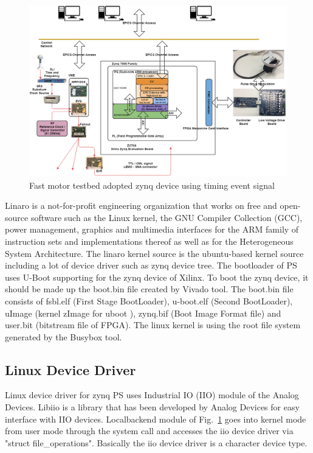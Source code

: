 \documentclass[a4paper,
              ]{jacow}
\begin{document}
\begin{figure}[!tbh]
	\centering
	\includegraphics*[width=\textwidth,height=0.7\textwidth]{WEPGF124f3}
	\caption{Fast motor testbed adopted zynq device using timing event signal}
	\label{stepper}
\end{figure}

Linaro\cite{linaro} is a not-for-profit engineering organization that works on free and open-source software such as the Linux kernel, the GNU Compiler Collection (GCC), power management, graphics and multimedia interfaces for the ARM family of instruction sets and implementations thereof as well as for the Heterogeneous System Architecture.  
The linaro kernel source is the ubuntu-based kernel source including a lot of device driver such as zynq device tree.
The bootloader of PS uses U-Boot\cite{u-boot} supporting for the zynq device of Xilinx. To boot the zynq device, it should be made up the boot.bin file created by Vivado\cite{vivado} tool. The boot.bin\cite{boot-bin} file consists of fsbl.elf (First Stage BootLoader), u-boot.elf (Second BootLoader), uImage (kernel zImage for uboot ), zynq.bif (Boot Image Format file) and user.bit (bitstream file of FPGA). The linux kernel is using the root file system generated by the Busybox\cite{busybox} tool.

\subsection{Linux Device Driver}
Linux device driver for zynq PS uses Industrial IO (IIO) module of the Analog Devices. Libiio\cite{iio} is a library that has been developed by Analog Devices for easy interface with IIO devices. Localbackend module of Fig.~\ref{stepper} goes into kernel mode from user mode through the system call and accesses the iio device driver via "struct file\_operations". Basically the iio device driver is a character device type.
\end{document}
